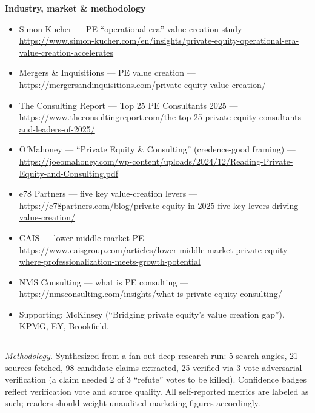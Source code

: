 \documentclass[11pt]{article}
\begin{document}
\textbf{Industry, market \& methodology}
\begin{itemize}
  \item Simon-Kucher --- PE ``operational era'' value-creation study --- \url{https://www.simon-kucher.com/en/insights/private-equity-operational-era-value-creation-accelerates}
  \item Mergers \& Inquisitions --- PE value creation --- \url{https://mergersandinquisitions.com/private-equity-value-creation/}
  \item The Consulting Report --- Top 25 PE Consultants 2025 --- \url{https://www.theconsultingreport.com/the-top-25-private-equity-consultants-and-leaders-of-2025/}
  \item O'Mahoney --- ``Private Equity \& Consulting'' (credence-good framing) --- \url{https://joeomahoney.com/wp-content/uploads/2024/12/Reading-Private-Equity-and-Consulting.pdf}
  \item e78 Partners --- five key value-creation levers --- \url{https://e78partners.com/blog/private-equity-in-2025-five-key-levers-driving-value-creation/}
  \item CAIS --- lower-middle-market PE --- \url{https://www.caisgroup.com/articles/lower-middle-market-private-equity-where-professionalization-meets-growth-potential}
  \item NMS Consulting --- what is PE consulting --- \url{https://nmsconsulting.com/insights/what-is-private-equity-consulting/}
  \item Supporting: McKinsey (``Bridging private equity's value creation gap''), KPMG, EY, Brookfield.
\end{itemize}

\vspace{1em}
\hrule
\vspace{0.6em}
\footnotesize
\emph{Methodology.} Synthesized from a fan-out deep-research run: 5 search angles,
21 sources fetched, 98 candidate claims extracted, 25 verified via 3-vote
adversarial verification (a claim needed 2 of 3 ``refute'' votes to be killed).
Confidence badges reflect verification vote and source quality. All self-reported
metrics are labeled as such; readers should weight unaudited marketing figures
accordingly.
\end{document}
